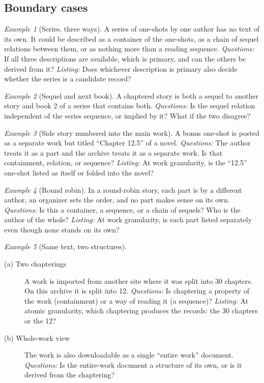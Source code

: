 \documentclass{amsart}
\theoremstyle{remark}
\newtheorem{eg}{Example}
\begin{document}
    \subsection*{Boundary cases}
    \begin{eg}[Series, three ways]\label{eg:series}
        A series of one-shots by one author has no text of its own. It could be described as a container of the one-shots, as a chain of sequel relations between them, or as nothing more than a reading sequence.
        \emph{Questions:} If all three descriptions are available, which is primary, and can the others be derived from it?
        \emph{Listing:} Does whichever description is primary also decide whether the series is a candidate record?
    \end{eg}
    \begin{eg}[Sequel and next book]\label{eg:sequel-vs-book}
        A chaptered story is both a sequel to another story and book 2 of a series that contains both.
        \emph{Questions:} Is the sequel relation independent of the series sequence, or implied by it? What if the two disagree?
    \end{eg}
    \begin{eg}[Side story numbered into the main work]\label{eg:bonus-chapter}
        A bonus one-shot is posted as a separate work but titled ``Chapter 12.5'' of a novel.
        \emph{Questions:} The author treats it as a part and the archive treats it as a separate work. Is that containment, relation, or sequence?
        \emph{Listing:} At work granularity, is the ``12.5'' one-shot listed as itself or folded into the novel?
    \end{eg}
    \begin{eg}[Round robin]\label{eg:round-robin}
        In a round-robin story, each part is by a different author, an organizer sets the order, and no part makes sense on its own.
        \emph{Questions:} Is this a container, a sequence, or a chain of sequels? Who is the author of the whole?
        \emph{Listing:} At work granularity, is each part listed separately even though none stands on its own?
    \end{eg}
    \begin{eg}[Same text, two structures]\label{eg:two-structures}
        \begin{description}
          \item[(a) Two chapterings] A work is imported from another site where it was split into 30 chapters. On this archive it is split into 12.
          \emph{Questions:} Is chaptering a property of the work (containment) or a way of reading it (a sequence)?
          \emph{Listing:} At atomic granularity, which chaptering produces the records: the 30 chapters or the 12?
          \item[(b) Whole-work view] The work is also downloadable as a single ``entire work'' document.
          \emph{Questions:} Is the entire-work document a structure of its own, or is it derived from the chaptering?
        \end{description}
    \end{eg}
\end{document}
